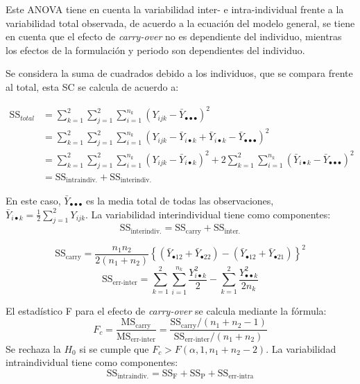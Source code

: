 \documentclass[]{article}
\begin{document}
Este ANOVA tiene en cuenta la variabilidad inter- e intra-individual
frente a la variabilidad total observada, de acuerdo a la ecuación del
modelo general, se tiene en cuenta que el efecto de \emph{carry-over} no
es dependiente del individuo, mientras los efectos de la formulación y
periodo son dependientes del individuo.

Se considera la suma de cuadrados debido a los individuos, que se
compara frente al total, esta SC se calcula de acuerdo a:

\[
\begin{aligned}
\textrm{SS}_{total} &=\sum_{k=1}^{2}\sum_{j=1}^{2}\sum_{i=1}^{n_{k}}{\left(Y_{ijk}-\bar{Y}_{\bullet\bullet\bullet}\right)^2}\\
        &=\sum_{k=1}^{2}\sum_{j=1}^{2}\sum_{i=1}^{n_{k}}{\left(Y_{ijk}-\bar{Y}_{i\bullet k}+\bar{Y}_{i\bullet k}-\bar{Y}_{\bullet\bullet\bullet}\right)^{2}}\\
        &=\sum_{k=1}^{2}\sum_{j=1}^{2}\sum_{i=1}^{n_{k}}{\left (Y_{ijk}-\bar{Y}_{i\bullet k}\right)^{2}}+2\sum_{k=1}^{2}\sum_{i=1}^{n_{k}}{\left (\bar{Y}_{i\bullet k}-\bar{Y}_{\bullet\bullet\bullet}\right)^{2}}\\
        &=\textrm{SS}_{\textrm{intraindiv.}}+\textrm{SS}_{\textrm{interindiv.}}
\end{aligned}
\]

En este caso, \(\bar{Y}_{\bullet\bullet\bullet}\) es la media total de
todas las observaciones,
\(\bar{Y}_{i\bullet k} = \frac{1}{2} \sum_{j=1}^{2}{Y_{ijk}}\). La
variabilidad interindividual tiene como componentes:
\[\textrm{SS}_{\textrm{interindiv.}}= \textrm{SS}_{\textrm{carry}}+\textrm{SS}_{\textrm{inter.}}\]

\[\textrm{SS}_{\textrm{carry}}= \frac{n_{1}n_{2}}{2\left(n_{1}+n_{2}\right)} \left\{\left(\bar{Y}_{\bullet 12}+\bar{Y}_{\bullet 22}\right)-\left(\bar{Y}_{\bullet 12}+\bar{Y}_{\bullet 21}\right)\right\}^{2}\]
\[\textrm{SS}_{\textrm{err-inter}}=\sum_{k=1}^{2}\sum_{i=1}^{n_{k}}{\frac{Y_{i\bullet k}^{2}}{2}}-\sum_{k=1}^{2}{\frac{Y_{\bullet\bullet k}^{2}}{2n_{k}}}\]

El estadístico F para el efecto de \emph{carry-over} se calcula mediante
la fórmula:\\
\[
F_{c}=
\frac{\textrm{MS}_{\textrm{carry}}}{\textrm{MS}_{\textrm{err-inter}}} = 
\frac{\textrm{SS}_{\textrm{carry}}/\left(n_{1}+n_{2}-1\right)}{\textrm{SS}_{\textrm{err-inter}}/\left(n_{1}+n_{2}\right)}
\] Se rechaza la \(H_{0}\) si se cumple que
\(F_{c} > F(\alpha,1,n_{1}+n_{2}-2)\). La variabilidad intraindividual
tiene como componentes:\\
\[
\textrm{SS}_{\textrm{intraindiv.}}= \textrm{SS}_{\textrm{F}}+\textrm{SS}_{\textrm{P}}+\textrm{SS}_{\textrm{err-intra}}
\]
\end{document}
